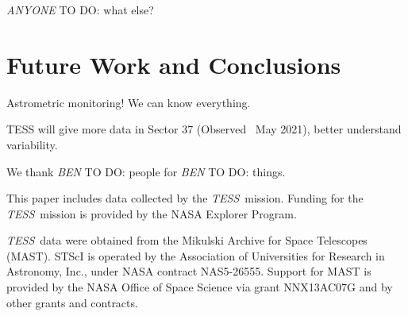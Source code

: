 \documentclass[twocolumn]{aastex63}
\newcommand{\tess}{{\it TESS}}
\newcommand{\todo}[3]{{\color{#2} \emph{#1} TO DO: #3}}
\newcommand{\btmtodo}[1]{\todo{BEN}{blue}{#1}}
\newcommand{\anytodo}[1]{\todo{ANYONE}{green}{#1}}
\begin{document}
\anytodo{what else?}


\section{Future Work and Conclusions}

Astrometric monitoring! We can know everything.

TESS will give more data in Sector 37 (Observed ~May 2021), better understand variability. 















\acknowledgements

We thank \btmtodo{people} for \btmtodo{things}.






This paper includes data collected by the \tess\ mission. Funding for the \tess\ mission is provided by the NASA Explorer Program.

\tess\ data were obtained from the Mikulski Archive for Space Telescopes
(MAST).
STScI is operated by the Association of Universities for Research in
Astronomy, Inc., under NASA contract NAS5-26555.
Support for MAST is provided by the NASA Office of Space Science via grant
NNX13AC07G and by other grants and contracts.









\end{document}
